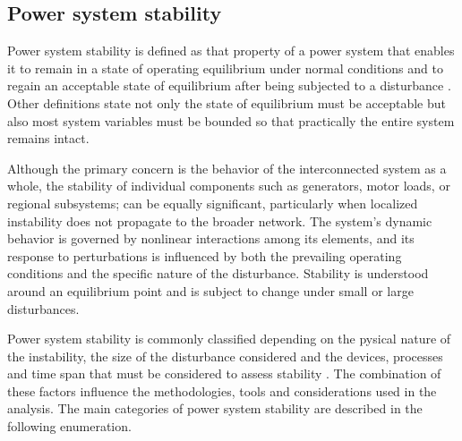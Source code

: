 
\subsection{Power system stability}

Power system stability is defined as that property of a power system that enables it to 
remain in a state of operating equilibrium under normal conditions and to regain an acceptable 
state of equilibrium after being subjected to a disturbance \cite{StabilityAndControlKundur}. Other definitions
state not only the state of equilibrium must be acceptable but also most system variables must be 
bounded so that practically the entire system remains intact\cite{kundurDef}.


Although the primary concern is the behavior of the interconnected system as a whole, the stability of individual
components such as generators, motor loads, or regional subsystems; can be equally significant, particularly when 
localized instability does not propagate to the broader network. The system's dynamic behavior is governed by nonlinear 
interactions among its elements, and its response to perturbations is influenced by both the prevailing operating conditions
and the specific nature of the disturbance. Stability is understood around an equilibrium point and is subject to change
under small or large disturbances.

Power system stability is commonly classified depending on the pysical nature of the instability, the size of the disturbance 
considered and the devices, processes and time span that must be considered to assess stability \cite{kundurDef}.
The combination of these factors influence the methodologies, tools and considerations used in the analysis. The main categories of power system stability are 
described in the following enumeration.

